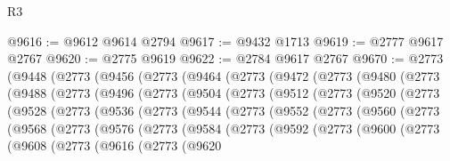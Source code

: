 \begin{lexlean}{R3}
\begin{coremodule}
@9616 := @9612 @9614 @2794
@9617 := @9432 @1713
@9619 := @2777 @9617 @2767
@9620 := @2775 @9619
@9622 := @2784 @9617 @2767
@9670 := @2773
    (@9448
      (@2773
        (@9456
          (@2773
            (@9464
              (@2773
                (@9472
                  (@2773
                    (@9480
                      (@2773
                        (@9488
                          (@2773
                            (@9496
                              (@2773
                                (@9504
                                  (@2773
                                    (@9512
                                      (@2773
                                        (@9520
                                          (@2773
                                            (@9528
                                              (@2773
                                                (@9536
                                                  (@2773
                                                    (@9544
                                                      (@2773
                                                        (@9552
                                                          (@2773
                                                            (@9560
                                                              (@2773
                                                                (@9568
                                                                  (@2773
                                                                    (@9576
                                                                      (@2773
                                                                        (@9584
                                                                          (@2773
                                                                            (@9592
                                                                              (@2773
                                                                                (@9600
                                                                                  (@2773
                                                                                    (@9608
                                                                                      (@2773
                                                                                        (@9616
                                                                                          (@2773
                                                                                            (@9620

\end{coremodule}
\end{lexlean}
